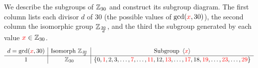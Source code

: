 \begin{example}{}{}
We describe the subgroups of $\mathbb{Z}_{30}$ and construct its subgroup diagram. The first column lists each divisor $d$ of $30$ (the possible values of $\gcd(\textcolor{red}{x},30)$), the second column the isomorphic group $\mathbb{Z}_{\frac{30}d}$, and the third the subgroup generated by each value $\textcolor{red}{x}\in\mathbb{Z}_{30}$.
  \[
  	\def\arraystretch{1.05}
  	\begin{array}[t]{c|c|c}
			d=\gcd(\textcolor{red}{x},30) & \text{Isomorph }\Z_{\frac{30}d} & \text{Subgroup } \ip{\textcolor{red}{x}} \\\hline
			1 & \Z_{30} & \{0,\textcolor{red}{1},2,3,\ldots,\textcolor{red}{7},\ldots,\textcolor{red}{11},12,\textcolor{red}{13},\ldots,\textcolor{red}{17},18,\textcolor{red}{19},\ldots,\textcolor{red}{23},\ldots,\textcolor{red}{29}\}\\

\end{array}\]
\end{example}
